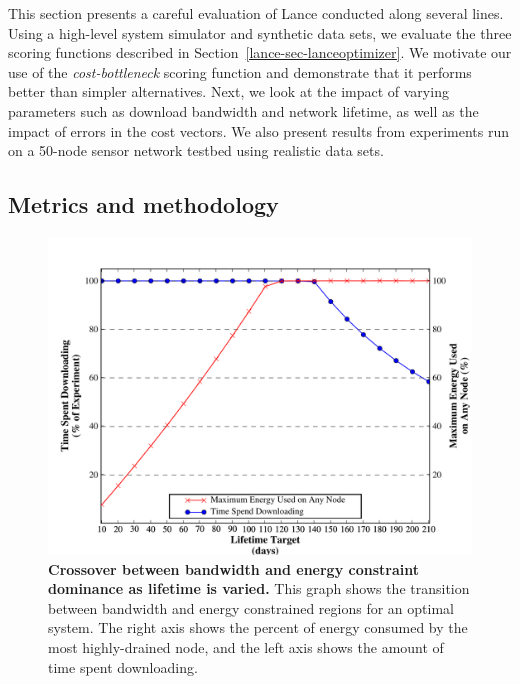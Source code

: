 This section presents a careful evaluation of Lance conducted along several
lines.  Using a high-level system simulator and synthetic data sets, we
evaluate the three scoring functions described in
Section~\ref{lance-sec-lanceoptimizer}. We motivate our use of the
\emph{cost-bottleneck} scoring function and demonstrate that it performs
better than simpler alternatives.  Next, we look at the impact of varying
parameters such as download bandwidth and network lifetime, as well as the
impact of errors in the cost vectors.  We also present results from
experiments run on a 50-node sensor network testbed using realistic data
sets.

\subsection{Metrics and methodology}

\begin{figure}[t]
\label{lance-sec-eval-crossover}
\begin{center}
\includegraphics[width=1.0\hsize]{./6-lance/figs/gwa/crossover/BANDWIDTHVENERGY.pdf}
\end{center}
\caption{\textbf{Crossover between bandwidth and energy constraint dominance
as lifetime is varied.} 
This graph shows the transition between bandwidth and energy constrained
regions for an optimal system.  The right axis shows the percent of energy
consumed by the most highly-drained node, and the left axis shows the amount
of time spent downloading.}
\end{figure}

